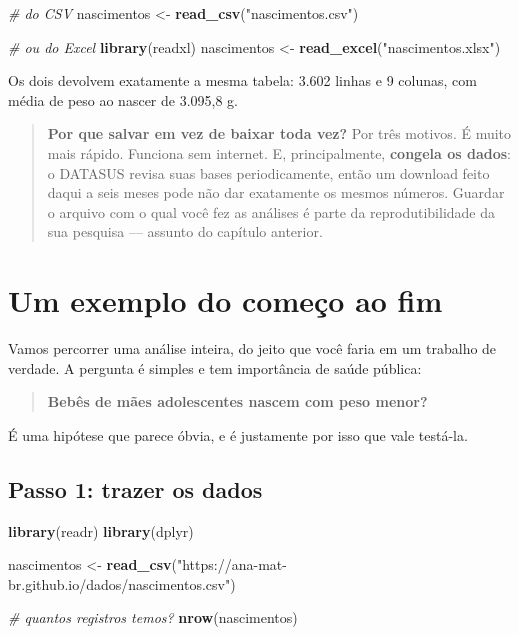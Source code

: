 \documentclass[
]{book}
\newenvironment{Shaded}{\begin{snugshade}}{\end{snugshade}}
\newcommand{\CommentTok}[1]{\textcolor[rgb]{0.56,0.35,0.01}{\textit{#1}}}
\newcommand{\FunctionTok}[1]{\textcolor[rgb]{0.13,0.29,0.53}{\textbf{#1}}}
\newcommand{\NormalTok}[1]{#1}
\newcommand{\OtherTok}[1]{\textcolor[rgb]{0.56,0.35,0.01}{#1}}
\newcommand{\StringTok}[1]{\textcolor[rgb]{0.31,0.60,0.02}{#1}}
\begin{document}
\begin{Shaded}
\begin{Highlighting}[]
\CommentTok{\# do CSV}
\NormalTok{nascimentos }\OtherTok{\textless{}{-}} \FunctionTok{read\_csv}\NormalTok{(}\StringTok{"nascimentos.csv"}\NormalTok{)}

\CommentTok{\# ou do Excel}
\FunctionTok{library}\NormalTok{(readxl)}
\NormalTok{nascimentos }\OtherTok{\textless{}{-}} \FunctionTok{read\_excel}\NormalTok{(}\StringTok{"nascimentos.xlsx"}\NormalTok{)}
\end{Highlighting}
\end{Shaded}

Os dois devolvem exatamente a mesma tabela: 3.602 linhas e 9 colunas, com média de peso ao nascer de 3.095,8 g.

\begin{quote}
\textbf{Por que salvar em vez de baixar toda vez?} Por três motivos. É muito mais rápido. Funciona sem internet. E, principalmente, \textbf{congela os dados}: o DATASUS revisa suas bases periodicamente, então um download feito daqui a seis meses pode não dar exatamente os mesmos números. Guardar o arquivo com o qual você fez as análises é parte da reprodutibilidade da sua pesquisa --- assunto do capítulo anterior.
\end{quote}

\section{Um exemplo do começo ao fim}\label{um-exemplo-do-comeuxe7o-ao-fim}

Vamos percorrer uma análise inteira, do jeito que você faria em um trabalho de verdade. A pergunta é simples e tem importância de saúde pública:

\begin{quote}
\textbf{Bebês de mães adolescentes nascem com peso menor?}
\end{quote}

É uma hipótese que parece óbvia, e é justamente por isso que vale testá-la.

\subsection{Passo 1: trazer os dados}\label{passo-1-trazer-os-dados}

\begin{Shaded}
\begin{Highlighting}[]
\FunctionTok{library}\NormalTok{(readr)}
\FunctionTok{library}\NormalTok{(dplyr)}

\NormalTok{nascimentos }\OtherTok{\textless{}{-}} \FunctionTok{read\_csv}\NormalTok{(}\StringTok{"https://ana{-}mat{-}br.github.io/dados/nascimentos.csv"}\NormalTok{)}

\CommentTok{\# quantos registros temos?}
\FunctionTok{nrow}\NormalTok{(nascimentos)}
\end{Highlighting}
\end{Shaded}
\end{document}
